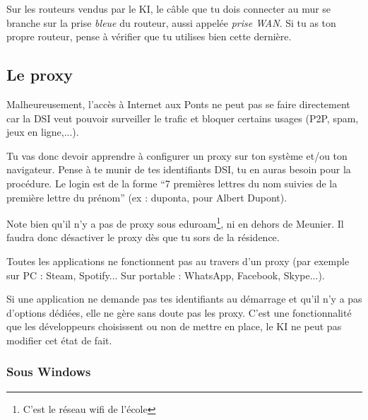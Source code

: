 \documentclass{ki019}
\begin{document}
    Sur les routeurs vendus par le KI, le câble que tu dois connecter au mur se branche sur la prise \emph{bleue} du routeur, aussi appelée \emph{prise WAN}. Si tu as ton propre routeur, pense à vérifier que tu utilises bien cette dernière.



  \newpage
    \subsection{Le proxy}
    {Malheureusement, l’accès à Internet aux Ponts ne peut pas se faire directement car la DSI veut pouvoir surveiller le trafic et bloquer certains usages (P2P, spam, jeux en ligne,...).}

    Tu vas donc devoir apprendre à configurer un proxy sur ton système et/ou ton navigateur. Pense à te munir de tes identifiants DSI, tu en auras besoin pour la procédure. Le login est de la forme “7 premières lettres du nom suivies de la première lettre du prénom” (ex : duponta, pour Albert Dupont).

    Note bien qu'il n'y a pas de proxy sous eduroam\footnote{C'est le réseau wifi de l'école}, ni en dehors de Meunier. Il faudra donc désactiver le proxy dès que tu sors de la résidence.

    \begin{kiframe}
      Toutes les applications ne fonctionnent pas au travers d'un proxy (par exemple sur PC : Steam, Spotify... Sur portable : WhatsApp, Facebook, Skype...).

      Si une application ne demande pas tes identifiants au démarrage et qu'il n'y a pas d'options dédiées, elle ne gère sans doute pas les proxy. C'est une fonctionnalité que les développeurs choisissent ou non de mettre en place, le KI ne peut pas modifier cet état de fait.
    \end{kiframe}

\newpage
      \subsubsection{Sous Windows}
\end{document}
